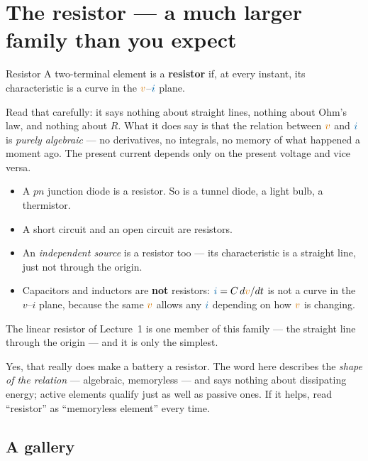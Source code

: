 \documentclass[11pt,a4paper]{article}
\newcommand{\Icol}[1]{\textcolor{ccur}{#1}}
\newcommand{\Vcol}[1]{\textcolor{cvolt}{#1}}
\begin{document}
\section{The resistor --- a much larger family than you expect}

\begin{definitionbox}{Resistor}
A two-terminal element is a \textbf{resistor} if, at every instant, its characteristic is a
curve in the $\Vcol{v}$--$\Icol{i}$ plane.
\end{definitionbox}

Read that carefully: it says nothing about straight lines, nothing about Ohm's law, and
nothing about $R$. What it does say is that the relation between $\Vcol{v}$ and $\Icol{i}$
is \emph{purely algebraic} --- no derivatives, no integrals, no memory of what happened a
moment ago. The present current depends only on the present voltage and vice versa.

\begin{ideabox}
\begin{itemize}
  \item A $pn$ junction diode is a resistor. So is a tunnel diode, a light bulb, a
        thermistor.
  \item A short circuit and an open circuit are resistors.
  \item An \emph{independent source} is a resistor too --- its characteristic is a
        straight line, just not through the origin.
  \item Capacitors and inductors are \textbf{not} resistors: $\Icol{i} = C\,d\Vcol{v}/dt$
        is not a curve in the $v$--$i$ plane, because the same $\Vcol{v}$ allows any
        $\Icol{i}$ depending on how $\Vcol{v}$ is changing.
\end{itemize}
The linear resistor of Lecture~1 is one member of this family --- the straight line through
the origin --- and it is only the simplest.
\end{ideabox}

Yes, that really does make a battery a resistor. The word here describes the \emph{shape of
the relation} --- algebraic, memoryless --- and says nothing about dissipating energy;
active elements qualify just as well as passive ones. If it helps, read ``resistor'' as
``memoryless element'' every time.

\subsection{A gallery}
\end{document}
